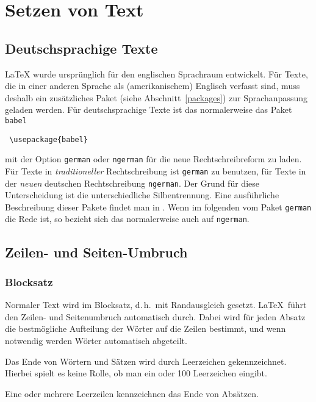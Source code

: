  
\section{Setzen von Text}
 

\subsection{Deutschsprachige Texte}\label{deutsch}
\LaTeX{} wurde ursprünglich für den englischen Sprachraum entwickelt.
Für Texte, die in einer anderen Sprache als (amerikanischem)
Englisch verfasst sind, muss deshalb ein zusätzliches Paket 
(siehe Abschnitt~\ref{packages}) zur Sprachanpassung geladen werden.  
Für deutschsprachige Texte ist das normalerweise das Paket \texttt{babel} 
\begin{lstlisting}
 \usepackage{babel}
\end{lstlisting}
mit der Option \texttt{german} oder \texttt{ngerman} für die neue
Rechtschreibreform zu laden. 
Für Texte in \emph{traditioneller} Rechtschreibung ist \texttt{german}
zu benutzen, für Texte in der \emph{neuen} deutschen Rechtschreibung
\texttt{ngerman}.
Der Grund für diese Unterscheidung ist die unterschiedliche Silbentrennung.
Eine ausführliche Beschreibung dieser Pakete findet man in \cite{germdoc}.  
Wenn im folgenden vom Paket \texttt{german} die Rede ist, 
so bezieht sich das normalerweise auch auf \texttt{ngerman}.


\subsection{Zeilen- und Seiten-Umbruch}

\subsubsection{Blocksatz}

Normaler Text wird im Blocksatz, d.\,h.~mit Randausgleich
gesetzt.  \LaTeX\ führt den Zeilen- und Seitenumbruch
automatisch durch.  Dabei wird für jeden Absatz die
bestmögliche Aufteilung der Wörter auf die Zeilen bestimmt,
und wenn notwendig werden Wörter automatisch abgeteilt.
\begin{LTXexample}
Das Ende von Wörtern und
Sätzen wird durch Leerzeichen 
gekennzeichnet.
Hierbei spielt es keine Rolle,
ob man ein  oder           100
Leerzeichen eingibt.
 
Eine oder mehrere Leerzeilen
kennzeichnen das Ende von
Absätzen.
\end{LTXexample}

